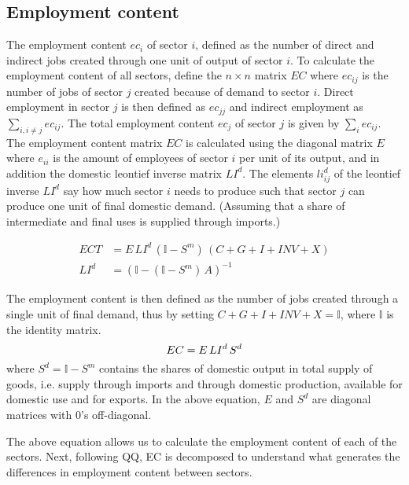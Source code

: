 \documentclass[12pt,english]{article}
\begin{document}
\subsection{Employment content}

The employment content $ec_i$ of sector $i$, defined as the number of direct and indirect jobs created through one unit of output of sector $i$. To calculate the employment content of all sectors, define the $n \times n$ matrix $EC$ where $ec_{ij}$  is the number of jobs of sector $j$ created because of demand to sector $i$. Direct employment in sector $j$ is then defined as $ec_{jj}$ and indirect employment as $\sum_{i, i\neq j} ec_{ij}$. The total employment content $ec_j$ of sector $j$ is given by $\sum_i ec_{ij}$. The employment content matrix $EC$ is calculated using the diagonal matrix $E$ where $e_{ii}$ is the amount of employees of sector $i$ per unit of its output, and in addition the domestic leontief inverse matrix $LI^d$. The elements $li_{ij}^d$ of the leontief inverse $LI^d$ say how much sector $i$ needs to produce such that sector $j$ can produce one unit of final domestic demand. (Assuming that a share of intermediate and final uses is supplied through imports.)

\begin{align}
	ECT	 &= E\, LI^d \, (\mathbb{I} - S^m)\, (C + G + I + INV + X) \label{IO3} \\ 
	LI^d &= (\mathbb{I} - (\mathbb{I}-S^m)\, A)^{-1} \label{leontiefInverse_d}
\end{align}

The employment content is then defined as the number of jobs created through a single unit of final demand, thus by setting $C + G + I + INV + X=\mathbb{I}$, where $\mathbb{I}$ is the identity matrix. 
\begin{equation}
	EC	= E\, LI^d \, S^d \label{EC} \\ 
\end{equation}
where $S^d = \mathbb{I} - S^m$ contains the shares of domestic output in total supply of goods, i.e. supply through imports and through domestic production, available for domestic use and for exports. In the above equation, $E$ and $S^d$ are diagonal matrices with 0's off-diagonal.


The above equation allows us to calculate the employment content of each of the sectors. Next, following QQ, EC is decomposed to understand what generates the differences in employment content between sectors. 
\end{document}

